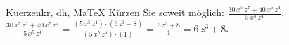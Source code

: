 \begin{MAufgabe}{Kuerzen}{kr, dh, MaTeX}
K\"urzen Sie soweit m\"oglich: $\frac{30\, x^5\, z^7 + 40\, x^5\, z^4}{5\, x^5\, z^4}$.\\ 
\ifLsg\MLoesung
\quad $\frac{30\, x^5\, z^7 + 40\, x^5\, z^4}{5\, x^5\, z^4}=\frac{(5\, x^5\, z^4)\cdot(6\, z^3 + 8)}{(5\, x^5\, z^4)\cdot(1)}=\frac{6\, z^3 + 8}{1}=6\, z^3 + 8$.\else\relax\fi
 \end{MAufgabe}